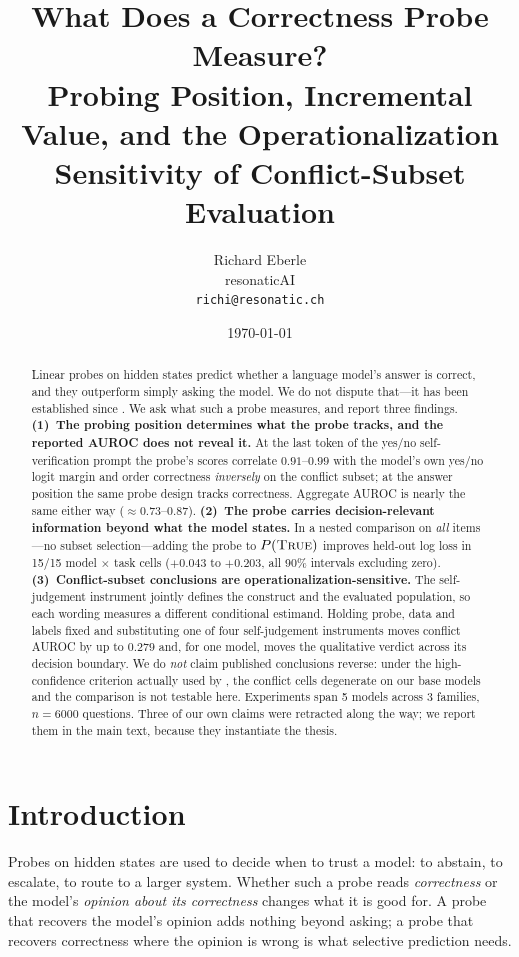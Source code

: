 \documentclass[10pt]{article}
\title{What Does a Correctness Probe Measure?\\
\large Probing Position, Incremental Value, and the Operationalization\\
Sensitivity of Conflict-Subset Evaluation}
\author{Richard Eberle\\ resonaticAI \\ \texttt{richi@resonatic.ch}}
\date{\today}
\newcommand{\ptrue}{P(\textsc{True})}
\begin{document}
\maketitle

\begin{abstract}
Linear probes on hidden states predict whether a language model's answer is correct, and they
outperform simply asking the model. We do not dispute that---it has been established since
\citet{azaria2023internal}. We ask what such a probe measures, and report three findings.
\textbf{(1)~The probing position determines what the probe tracks, and the reported AUROC does not
reveal it.} At the last token of the yes/no self-verification prompt the probe's scores correlate
$0.91$--$0.99$ with the model's own yes/no logit margin and order correctness \emph{inversely} on
the conflict subset; at the answer position the same probe design tracks correctness. Aggregate
AUROC is nearly the same either way ($\approx0.73$--$0.87$).
\textbf{(2)~The probe carries decision-relevant information beyond what the model states.} In a
nested comparison on \emph{all} items---no subset selection---adding the probe to $\ptrue{}$
improves held-out log loss in 15/15 model $\times$ task cells ($+0.043$ to $+0.203$, all 90\%
intervals excluding zero).
\textbf{(3)~Conflict-subset conclusions are operationalization-sensitive.} The self-judgement
instrument jointly defines the construct and the evaluated population, so each wording measures a
different conditional estimand. Holding probe, data and labels fixed and substituting one of four
self-judgement instruments moves conflict AUROC by up to $0.279$ and, for one model, moves the
qualitative verdict across its decision boundary. We do \emph{not} claim published conclusions
reverse: under the high-confidence criterion actually used by \citet{diagnosing2026}, the conflict
cells degenerate on our base models and the comparison is not testable here.
Experiments span 5 models across 3 families, $n=6000$ questions. Three of our own claims were
retracted along the way; we report them in the main text, because they instantiate the thesis.
\end{abstract}

\section{Introduction}

Probes on hidden states are used to decide when to trust a model: to abstain, to escalate, to route
to a larger system. Whether such a probe reads \emph{correctness} or the model's \emph{opinion about
its correctness} changes what it is good for. A probe that recovers the model's opinion adds nothing
beyond asking; a probe that recovers correctness where the opinion is wrong is what selective
prediction needs.
\end{document}

